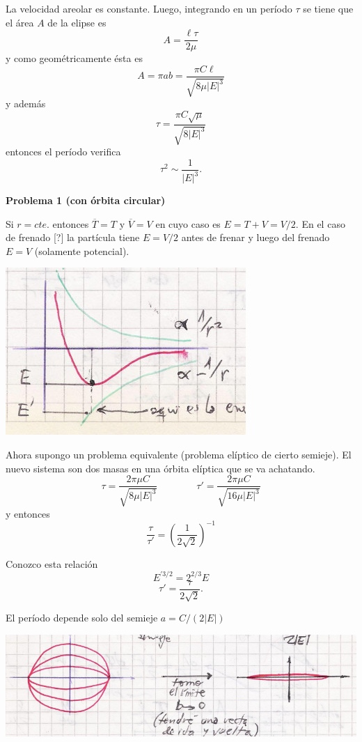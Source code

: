 \documentclass[10pt,oneside]{CBFT_book}
\begin{document}
La velocidad areolar es constante. Luego, integrando en un período $\tau$ se tiene que el área $A$ de la elipse es
\[
	A = \frac{\ell \tau}{2\mu}
\]
y como geométricamente ésta es 
\[
	A = \pi a b = \frac{ \pi C \ell }{\sqrt{ 8 \mu |E|^3 }}
\]
y además 
\[
	\tau = \frac{ \pi C \sqrt{\mu } }{ \sqrt{ 8 |E|^3 } }
\]
entonces el período verifica 
\[
	\tau^2 \sim \frac 1 {|E|^{3}}.
\]

\begin{ejemplo}{\bf Problema 1 (con órbita circular)}

Si $r=cte.$ entonces $\overline{T}=T$ y $\overline{V}=V$ en cuyo caso es $E = T + V = V/2$. En el caso de frenado [?] la partícula
tiene $E=V/2$ antes de frenar y luego del frenado $E=V$ (solamente potencial).

\includegraphics[scale=0.3]{images/fig_mc_potencial_energy.jpg}

Ahora supongo un problema equivalente (problema elíptico de cierto semieje). El nuevo sistema son dos masas en una
órbita elíptica que se va achatando.
\[
	\tau = \frac{ 2 \pi \mu C }{\sqrt{ 8 \mu |E|^3 }} \qquad \qquad 
	\tau' = \frac{ 2 \pi \mu C }{\sqrt{ 16 \mu |E|^3 }}
\]
y entonces
\[
	\frac{\tau}{\tau'} = \left( \frac{1}{2\sqrt{2}} \right)^{-1}
\]

Conozco esta relación 
\[
	E^{'3/2} = 2^{2/3} E
\]
\[
	\tau' = \frac{\tau}{2\sqrt{2}}.
\]

El período depende solo del semieje $a = C/(2|E|)$

\includegraphics[scale=0.3]{images/fig_mc_potencial_energy_elipses.jpg}


\end{ejemplo}
\end{document}
